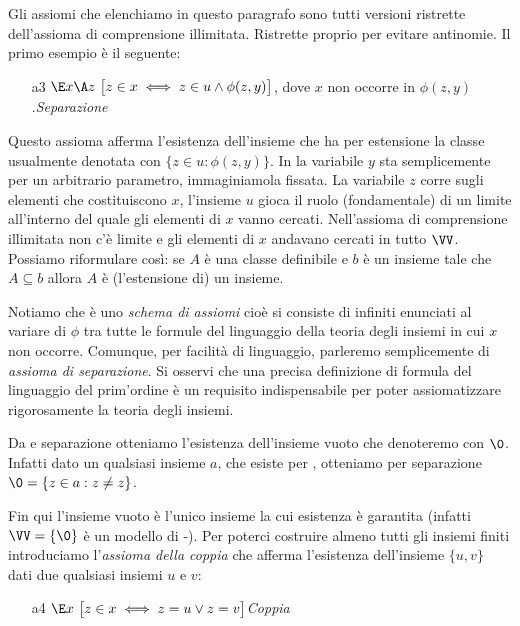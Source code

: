 Gli assiomi che elenchiamo in questo paragrafo sono tutti versioni ristrette dell'assioma di comprensione illimitata. Ristrette proprio per evitare antinomie. Il primo esempio \`e il seguente:

\begin{itemize}
\item[a3]$\E x \A z\ \big[ z\in x \iff z\in u\wedge\phi(z,y)\big]$, dove $x$ non occorre in $\phi(z,y)$.\hfill\emph{Separazione} 
\end{itemize}

Questo assioma afferma l'esistenza dell'insieme che ha per estensione la classe usualmente denotata con $\{z\in u : \phi(z,y)\}$. In  la variabile $y$ sta semplicemente per un arbitrario parametro, immaginiamola fissata. La variabile $z$ corre sugli elementi che costituiscono $x$, l'insieme $u$ gioca il ruolo (fondamentale) di un limite all'interno del quale gli elementi di $x$ vanno cercati. Nell'assioma di comprensione illimitata non c'\`e limite e gli elementi di $x$ andavano cercati in tutto $\VV$. Possiamo riformulare  cos\`i: se $A$ \`e una classe definibile e $b$ \`e un insieme tale che $A\subseteq b$ allora $A$ \`e (l'estensione di) un insieme.

Notiamo che  \`e uno \textit{schema di assiomi\/} cio\`e si consiste di infiniti enunciati al variare di $\phi$ tra tutte le formule del linguaggio della teoria degli insiemi in cui $x$ non occorre. Comunque, per facilit\`a di linguaggio, parleremo semplicemente di \textit{assioma di separazione}. Si osservi che una precisa definizione di formula del linguaggio del prim'ordine \`e un requisito indispensabile per poter assiomatizzare rigorosamente la teoria degli insiemi.

Da  e separazione otteniamo l'esistenza dell'insieme vuoto che denoteremo con $\0$. Infatti dato un qualsiasi insieme $a$, che esiste per , otteniamo per separazione $\0=\{z\in a: z\neq z\}$.


Fin qui l'insieme vuoto \`e l'unico insieme la cui esistenza \`e garantita (infatti $\VV=\{\0\}$ \`e un modello di -). Per poterci costruire almeno tutti gli insiemi finiti introduciamo l'\textit{assioma della coppia\/} che afferma l'esistenza dell'insieme $\{u,v\}$ dati due qualsiasi insiemi $u$ e $v$:

\begin{itemize}
\item[a4]$\E x \ \big[z\in x \iff  z=u\vee z=v\big]$\hfill \emph{Coppia}
\end{itemize}

